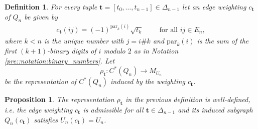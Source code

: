 \documentclass[a4paper]{amsart}
\newtheorem{definition}[thm]{Definition}
\newtheorem{proposition}[thm]{Proposition}
\begin{document}
\begin{definition}
    \label{weig::def:representation_rho_t}
    For every tuple $\mathbf{t} = [t_0, \dots, t_{n-1}] \in \Delta_{n-1}$ let an edge weighting $c_\mathbf{t}$ of $Q_n$ be given by
    \begin{align*}
        c_\mathbf{t}(ij) = (-1)^{\mathrm{par}_k(i)} \sqrt{t_k} \qquad \text{ for all } ij \in E_n,
    \end{align*}
    where $k < n$ is the unique number with $j = i \# k$ and $\mathrm{par}_k(i)$ is the sum of the first $(k+1)$-binary digits of $i$ modulo $2$ as in Notation \ref{pre::notation:binary_numbers}. 
    Let 
    $$
        \rho_\mathbf{t}: C^\ast(Q_n) \to M_{U_n}
    $$    
    be the representation of $C^\ast(Q_n)$ induced by the weighting $c_\mathbf{t}$.
\end{definition} 

\begin{proposition}
    The representation $\rho_\mathbf{t}$ in the previous definition is well-defined, i.e. the edge weighting $c_\mathbf{t}$ is admissible for all $\mathbf{t} \in \Delta_{n-1}$ and its induced subgraph $Q_n(c_\mathbf{t})$ satisfies $U_n(c_\mathbf{t}) = U_n$.
\end{proposition}
\end{document}
